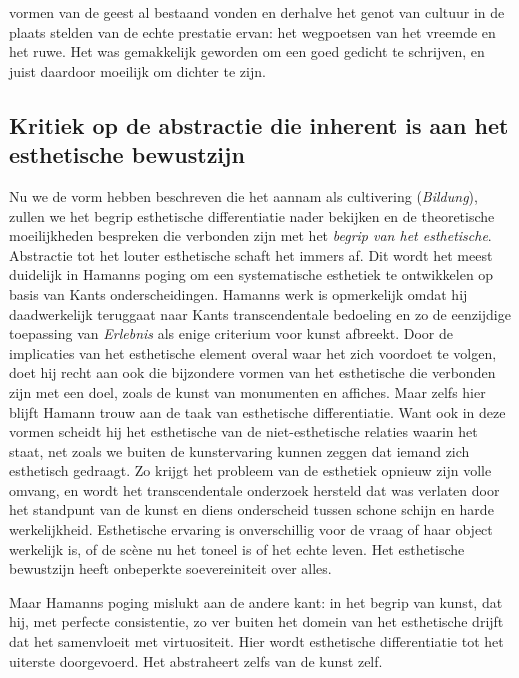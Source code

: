 vormen van de geest al bestaand vonden en derhalve het genot van cultuur in de plaats stelden van de echte prestatie ervan: het wegpoetsen van het vreemde en het ruwe. Het was gemakkelijk geworden om een goed gedicht te schrijven, en juist daardoor moeilijk om dichter te zijn.

\subsection{Kritiek op de abstractie die inherent is aan het esthetische bewustzijn}

Nu we de vorm hebben beschreven die het aannam als cultivering (\textit{Bildung}), zullen we het begrip esthetische differentiatie nader bekijken en de theoretische moeilijkheden bespreken die verbonden zijn met het \textit{begrip van het esthetische}. Abstractie tot het louter esthetische schaft het immers af. Dit wordt het meest duidelijk in Hamanns poging om een systematische esthetiek te ontwikkelen op basis van Kants onderscheidingen. Hamanns werk is opmerkelijk omdat hij daadwerkelijk teruggaat naar Kants transcendentale bedoeling en zo de eenzijdige toepassing van \textit{Erlebnis} als enige criterium voor kunst afbreekt. Door de implicaties van het esthetische element overal waar het zich voordoet te volgen, doet hij recht aan ook die bijzondere vormen van het esthetische die verbonden zijn met een doel, zoals de kunst van monumenten en affiches. Maar zelfs hier blijft Hamann trouw aan de taak van esthetische differentiatie. Want ook in deze vormen scheidt hij het esthetische van de niet-esthetische relaties waarin het staat, net zoals we buiten de kunstervaring kunnen zeggen dat iemand zich esthetisch gedraagt.
Zo krijgt het probleem van de esthetiek opnieuw zijn volle omvang, en wordt het transcendentale onderzoek hersteld dat was verlaten door het standpunt van de kunst en diens onderscheid tussen schone schijn en harde werkelijkheid. Esthetische ervaring is onverschillig voor de vraag of haar object werkelijk is, of de scène nu het toneel is of het echte leven. Het esthetische bewustzijn heeft onbeperkte soevereiniteit over alles.

Maar Hamanns poging mislukt aan de andere kant: in het begrip van kunst, dat hij, met perfecte consistentie, zo ver buiten het domein van het esthetische drijft dat het samenvloeit met virtuositeit. Hier wordt esthetische differentiatie tot het uiterste doorgevoerd. Het abstraheert zelfs van de kunst zelf.


